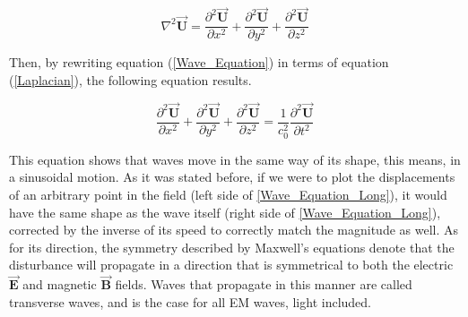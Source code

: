 \begin{equation}
    \nabla^2 \overrightarrow{\textbf{U}} = \frac{\partial^2 \overrightarrow{\textbf{U}}}{\partial x^2} + \frac{\partial^2 \overrightarrow{\textbf{U}}}{\partial y^2} + \frac{\partial^2 \overrightarrow{\textbf{U}}}{\partial z^2}
    \label{Laplacian}
\end{equation}

\newpage
Then, by rewriting equation (\ref{Wave_Equation}) in terms of equation (\ref{Laplacian}), the following equation results.

\begin{equation}
    \frac{\partial^2 \overrightarrow{\textbf{U}}}{\partial x^2} + \frac{\partial^2 \overrightarrow{\textbf{U}}}{\partial y^2} + \frac{\partial^2 \overrightarrow{\textbf{U}}}{\partial z^2} = \frac{1}{c_0^2}\frac{\partial^2 \overrightarrow{\textbf{U}}}{\partial t^2}
    \label{Wave_Equation_Long}
\end{equation}

This equation shows that waves move in the same way of its shape, this means, in a sinusoidal motion. As it was stated before, if we were to plot the displacements of an arbitrary point in the field (left side of \ref{Wave_Equation_Long}), it would have the same shape as the wave itself (right side of \ref{Wave_Equation_Long}), corrected by the inverse of its speed to correctly match the magnitude as well. As for its direction, the symmetry described by Maxwell's equations denote that the disturbance will propagate in a direction that is symmetrical to both the electric $\overrightarrow{\textbf{E}}$ and magnetic $\overrightarrow{\textbf{B}}$ fields. Waves that propagate in this manner are called transverse waves, and is the case for all EM waves, light included. 



